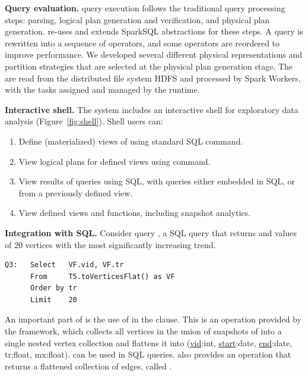 {\bf Query evaluation.}  \ql query execution follows the traditional
query processing steps: parsing, logical plan generation and
verification, and physical plan generation.  \ql re-uses and extends
SparkSQL abstractions for these steps.  A \ql query is rewritten into
a sequence of operators, and some operators are reordered to improve
performance.  We developed several different physical representations
and partition strategies that are selected at the physical plan
generation stage.  The \tgs are read from the distributed file system
HDFS and processed by Spark Workers, with the tasks assigned and
managed by the runtime.

{\bf Interactive shell.} The \ql system includes an interactive shell
for exploratory data analysis (Figure~\ref{fig:shell}).  Shell users
can:

\begin{enumerate}[leftmargin=*]
\item Define (materialized) views of \tg using standard SQL
   command.
\item View logical plans for defined views using 
  command.
\item View results of queries using SQL, with \ql queries either
  embedded in SQL, or from a previously defined view.
\item View defined views and functions, including snapshot analytics.
\end{enumerate}

{\bf Integration with SQL.}  Consider query , a SQL query
that returns  and  values of 20 vertices with the
most significantly increasing  trend.

\begin{small}
\begin{verbatim}
Q3:   Select   VF.vid, VF.tr  
      From     T5.toVerticesFlat() as VF
      Order by tr
      Limit    20
\end{verbatim}
\end{small}

An important part of  is the use of
 in the  clause.  This is an
operation provided by the \ql framework, which collects all vertices
in the union of snapshots of  into a single nested vertex
collection and flattens it into  (\underline{vid}:int,
\underline{start}:date, \underline{end}:date, tr:float, mx:float).
 can be used in SQL queries.  \ql also provides an operation
that returns a flattened collection of edges, called
.

